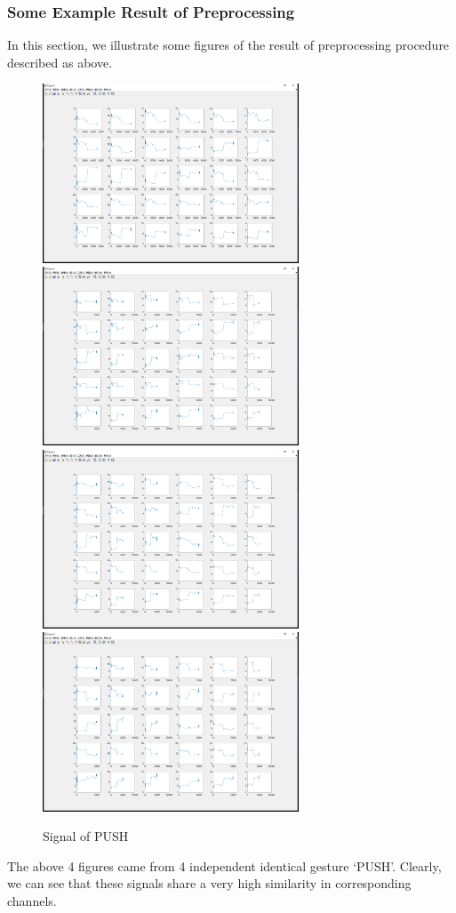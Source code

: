 \documentclass[conference]{IEEEtran}
\begin{document}
\subsubsection{Some Example Result of Preprocessing}
In this section, we illustrate some figures of the result of preprocessing procedure described as above.
\begin{figure}[H]
\centering
\includegraphics[width=3in]{PUSH1.png}
\includegraphics[width=3in]{PUSH2.png}
\includegraphics[width=3in]{PUSH3.png}
\includegraphics[width=3in]{PUSH4.png}
\caption{Signal of PUSH}
\end{figure}
The above 4 figures came from 4 independent identical gesture ‘PUSH’. Clearly, we can see that these signals share a very high similarity in corresponding channels.
\end{document}
